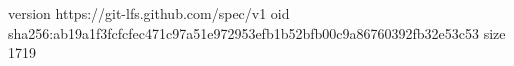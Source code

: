 version https://git-lfs.github.com/spec/v1
oid sha256:ab19a1f3fcfcfec471c97a51e972953efb1b52bfb00c9a86760392fb32e53c53
size 1719
